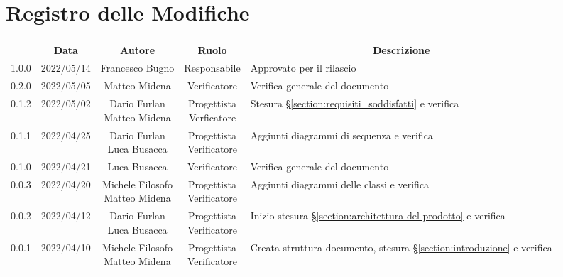 \thispagestyle{empty}
\section*{Registro delle Modifiche}

\begin{center}
	\renewcommand{\arraystretch}{1.8}
	\begin{longtable}[c]{c | c | c | c | p{5cm}}
		\rowcolor[HTML]{125E28}
		\multicolumn{1}{c}{\color[HTML]{FFFFFF} \textbf{Versione}} &
		\multicolumn{1}{c}{\color[HTML]{FFFFFF} \textbf{Data}}     &
		\multicolumn{1}{c}{\color[HTML]{FFFFFF} \textbf{Autore}}   &
		\multicolumn{1}{c}{\color[HTML]{FFFFFF} \textbf{Ruolo}}    &
		\multicolumn{1}{c}{\color[HTML]{FFFFFF} \textbf{Descrizione}} \\
		\endhead
		1.0.0 & 2022/05/14 & Francesco Bugno & Responsabile & Approvato per il rilascio \\ 
		0.2.0 & 2022/05/05 & Matteo Midena & Verificatore & Verifica generale del documento\\ 
		0.1.2 & 2022/05/02 & \Longunderstack{Dario Furlan\\Matteo Midena} & \Longunderstack{Progettista\\Verficatore}& Stesura §\ref{section:requisiti_soddisfatti} e verifica\\ 
		0.1.1 & 2022/04/25 & \Longunderstack{Dario Furlan\\Luca Busacca} & \Longunderstack{Progettista \\ Verificatore} & Aggiunti diagrammi di sequenza e verifica\\
		0.1.0 & 2022/04/21 & Luca Busacca & Verificatore & Verifica generale del documento\\
		0.0.3 & 2022/04/20 & \Longunderstack{Michele Filosofo \\ Matteo Midena} & \Longunderstack{Progettista\\Verificatore} & Aggiunti diagrammi delle classi e verifica\\ 
		0.0.2 & 2022/04/12 & \Longunderstack{Dario Furlan \\ Luca Busacca} & \Longunderstack{Progettista \\ Verificatore} & Inizio stesura §\ref{section:architettura del prodotto} e verifica \\
		0.0.1 & 2022/04/10 & \Longunderstack{Michele Filosofo \\ Matteo Midena} & \Longunderstack{Progettista \\ Verificatore} & Creata struttura documento, stesura §\ref{section:introduzione} e verifica\\ 
	\end{longtable}
\end{center}
